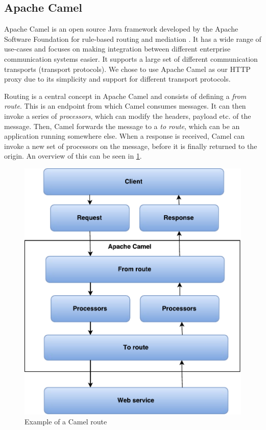 \subsection{Apache Camel}

Apache Camel is an open source Java framework developed by the Apache Software
Foundation for rule-based routing and mediation \cite{camel-homepage}. It has a
wide range of use-cases and focuses on making integration between different
enterprise communication systems easier. It supports a large set of different
communication transports (transport protocols). We chose to use Apache Camel as
our HTTP proxy due to its simplicity and support for different transport
protocols.

Routing is a central concept in Apache Camel and consists of defining a
\textit{from route}. This is an endpoint from which Camel consumes messages. It
can then invoke a series of \textit{processors}, which can modify the headers,
payload etc. of the message. Then, Camel forwards the message to a \textit{to
route}, which can be an application running somewhere else. When a response is
received, Camel can invoke a new set of processors on the message, before it is
finally returned to the origin. An overview of this can be seen in
\cref{figure:camel-route}.

\begin{figure}[h]
\centering
\includegraphics[scale=0.7]{images/camel_routes.pdf}
\caption{Example of a Camel route}
\label{figure:camel-route}
\end{figure}

